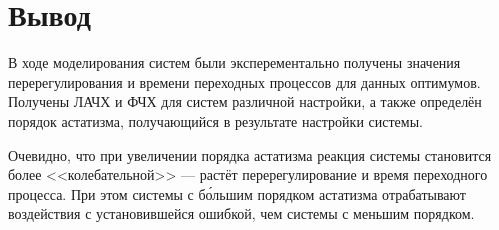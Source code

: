     \section{Вывод}
        В ходе моделирования систем были эксперементально получены значения перерегулирования и времени переходных процессов для данных оптимумов. Получены ЛАЧХ и ФЧХ для систем различной настройки, а также определён порядок астатизма, получающийся в результате настройки системы.

        Очевидно, что при увеличении порядка астатизма реакция системы становится более <<колебательной>> --- растёт перерегулирование и время переходного процесса. При этом системы с б\'{о}льшим порядком астатизма отрабатывают воздействия с установившейся ошибкой, чем системы с меньшим порядком.

